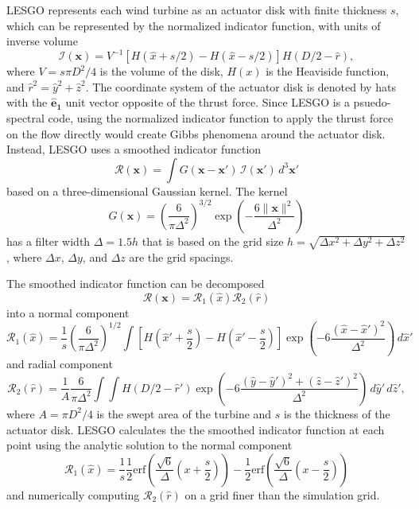 LESGO represents each wind turbine as an actuator disk with finite thickness $s$, which can be represented by the normalized indicator function, with units of inverse volume
\begin{equation}
\mathcal{I}(\mathbf{x}) = V^{-1}\left[ H(\hat{x}+s/2) - H(\hat{x} - s/2) \right] H(D/2 - \hat{r}),
\end{equation}
where $V = s \pi D^2/4$ is the volume of the disk, $H(x)$ is the Heaviside function, and $\hat{r}^2 = \hat{y}^2 + \hat{z}^2$. The coordinate system of the actuator disk is denoted by hats with the $\mathbf{\hat{e}_1}$ unit vector opposite of the thrust force. Since LESGO is a psuedo-spectral code, using the normalized indicator function to apply the thrust force on the flow directly would create Gibbs phenomena around the actuator disk. Instead, LESGO uses a smoothed indicator function
%
\begin{equation}
\mathcal{R}(\mathbf{x}) = \int G(\mathbf{x}-\mathbf{x'}) \, \mathcal{I}(\mathbf{x'}) \, d^3\mathbf{x'}
\end{equation}
%
based on a three-dimensional Gaussian kernel. The kernel
%
\begin{equation}
\label{eq:LESGO-Gaussian-kernel}
G(\mathbf{x}) = \left(\frac{6}{\pi \Delta^2}\right)^{3/2} \exp \left( -\frac{6\lVert\mathbf{x}\rVert^2}{\Delta^2} \right)
\end{equation}
%
has a filter width $\Delta = 1.5 h $ that is based on the grid size $h = \sqrt{\Delta x^2 + \Delta y^2 + \Delta z^2}$, where $\Delta x$, $\Delta y$, and $\Delta z$ are the grid spacings.  

The smoothed indicator function can be decomposed 
\begin{equation} \mathcal{R}(\mathbf{x}) = \mathcal{R}_1(\hat{x}) \mathcal{R}_2(\hat{r})
\end{equation}
into a normal component 
\begin{equation}
\mathcal{R}_1(\hat{x}) = \frac{1}{s} \left(\frac{6}{\pi \Delta^2}\right)^{1/2} \int \left[ H\left(\hat{x}'+\frac{s}{2}\right) - H\left(\hat{x}' - \frac{s}{2}\right) \right] \exp \left( -6\frac{(\hat{x}-\hat{x}')^2}{\Delta^2} \right) \, d \hat{x}' 
\end{equation} and radial component
 \begin{equation} 
 \mathcal{R}_2(\hat{r}) = \frac{1}{A}\frac{6}{\pi \Delta^2} \int \int H(D/2 - \hat{r}') \exp \left( -6\frac{(\hat{y}-\hat{y}')^2 + (\hat{z}-\hat{z}')^2}{\Delta^2} \right) \, d \hat{y}' \, d \hat{z}',
\end{equation} 
where $A = \pi D^2/4$ is the swept area of the turbine and $s$ is the thickness of the actuator disk. LESGO calculates the the smoothed indicator function at each point using the analytic solution to the normal component
\begin{equation}
\mathcal{R}_1(\hat{x}) = \frac{1}{s}\frac{1}{2}\mathrm{erf}\left(\frac{\sqrt{6}}{\Delta}\left(x+\frac{s}{2}\right) \right) - \frac{1}{2}\mathrm{erf}\left(\frac{\sqrt{6}}{\Delta}\left(x-\frac{s}{2}\right) \right)
\end{equation}
and numerically computing $\mathcal{R}_2(\hat{r})$ on a grid finer than the simulation grid.

